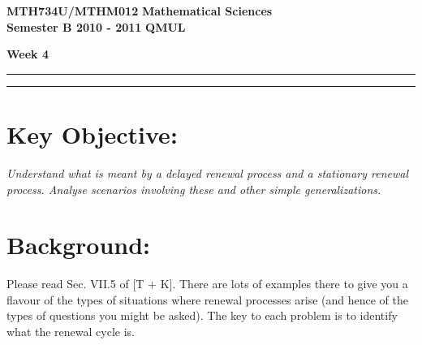 \documentclass[11pt,a4paper]{article}
\begin{document}
  \textbf{MTH734U/MTHM012} \hfill \textbf{Mathematical Sciences}\\
  \textbf{Semester B 2010 - 2011} \hfill \textbf{QMUL}
  \begin{center}
    \textbf{\huge Week 4}
  \end{center}
  \hrule \vspace{2mm} \hrule
  \section*{Key Objective:}
  \textit{Understand what is meant by a delayed renewal process and a stationary renewal process. Analyse scenarios involving these and other simple generalizations.}
  \section*{Background:}
  Please read Sec. VII.5 of [T + K]. There are lots of examples there to give you a flavour of the types of situations where renewal processes arise (and hence of the types of questions you might be asked). The key to each problem is to identify what the renewal cycle is.
\end{document}
